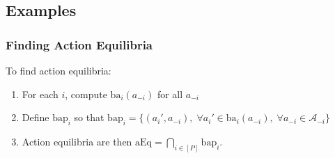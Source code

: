 \subsection{Examples}
\subsubsection{Finding Action Equilibria}
\begin{process} To find action equilibria:
    \begin{enumerate}
        \item For each $i$, compute $\text{ba}_i (a_{-i})$ for all $a_{-i}$
        \item Define $\text{bap}_i$ so that $\text{bap}_i = \{(a_i',a_{-i}), \; \forall a_i' \in \text{ba}_i (a_{-i}), \; \forall a_{-i} \in \mathcal{A}_{-i}\}$
        \item Action equilibria are then $\text{aEq} = \bigcap_{i\in [P]} \text{bap}_i$.
    \end{enumerate}
\end{process}
